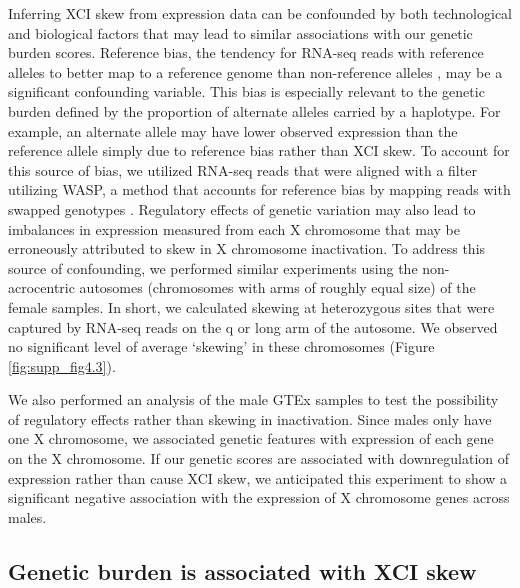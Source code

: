 Inferring XCI skew from expression data can be confounded by both technological and biological factors that may lead to similar associations with our genetic burden scores. Reference bias, the tendency for RNA-seq reads with reference alleles to better map to a reference genome than non-reference alleles \cite{Stevenson2013-cg}, may be a significant confounding variable. This bias is especially relevant to the genetic burden defined by the proportion of alternate alleles carried by a haplotype. For example, an alternate allele may have lower observed expression than the reference allele simply due to reference bias rather than XCI skew. To account for this source of bias, we utilized RNA-seq reads that were aligned with a filter utilizing WASP, a method that accounts for reference bias by mapping reads with swapped genotypes \cite{Van_de_Geijn2015-oy}.
Regulatory effects of genetic variation may also lead to imbalances in expression measured from each X chromosome that may be erroneously attributed to skew in X chromosome inactivation. To address this source of confounding, we performed similar experiments using the non-acrocentric autosomes (chromosomes with arms of roughly equal size) of the female samples. In short, we calculated skewing at heterozygous sites that were captured by RNA-seq reads on the q or long arm of the autosome. We observed no significant level of average ‘skewing’ in these chromosomes (Figure \ref{fig:supp_fig4.3}). 



We also performed an analysis of the male GTEx samples to test the possibility of regulatory effects rather than skewing in inactivation. Since males only have one X chromosome, we associated genetic features with expression of each gene on the X chromosome. If our genetic scores are associated with downregulation of expression rather than cause XCI skew, we anticipated this experiment to show a significant negative association with the expression of X chromosome genes across males.

\subsection{Genetic burden is associated with XCI skew}

